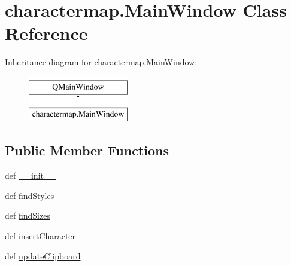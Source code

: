 \hypertarget{classcharactermap_1_1MainWindow}{}\section{charactermap.\+Main\+Window Class Reference}
\label{classcharactermap_1_1MainWindow}
Inheritance diagram for charactermap.\+Main\+Window\+:\begin{figure}[H]
\begin{center}
\leavevmode
\includegraphics[height=2.000000cm]{classcharactermap_1_1MainWindow}
\end{center}
\end{figure}
\subsection*{Public Member Functions}
\begin{DoxyCompactItemize}
\item 
def \hyperlink{classcharactermap_1_1MainWindow_adb4574e5d4ed06d287546f0eaf3e6051}{\+\_\+\+\_\+init\+\_\+\+\_\+}
\item 
def \hyperlink{classcharactermap_1_1MainWindow_aaae8054cf1279bbad95ab2b5b305a525}{find\+Styles}
\item 
def \hyperlink{classcharactermap_1_1MainWindow_ade200179a8b53d8a03e7c09c26cb8ad8}{find\+Sizes}
\item 
def \hyperlink{classcharactermap_1_1MainWindow_a87d9caccbcdb83808be2a45727178f24}{insert\+Character}
\item 
def \hyperlink{classcharactermap_1_1MainWindow_a87077aa1a943688b778ca53822c09c01}{update\+Clipboard}
\end{DoxyCompactItemize}
